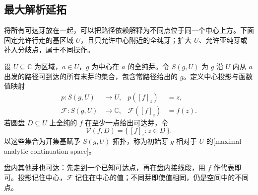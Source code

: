 \subsection{最大解析延拓}
\label{b3:subsec:090204}

将所有可达芽放在一起，可以把路径依赖解释为不同点位于同一个中心上方。下面固定允许行走的基区域 \(U\)，且只允许中心附近的全纯芽；扩大 \(U\)、允许亚纯芽或补入分歧点，属于不同操作。

\begin{definition}\label{b3:def:09-maximal-germ-space}
设 \(U\subseteq\mathbb C\) 为区域，\(a\in U\)，\(g\) 为中心在 \(a\) 的全纯芽。令 \(S(g,U)\) 为 \(g\) 沿 \(U\) 内从 \(a\) 出发的路径可到达的所有末芽的集合，包含常路径给出的 \(g\)。定义中心投影与函数值映射
\[
 \begin{aligned}
 p:S(g,U)&\longrightarrow U,&p([f]_z)&=z,\\
 \mathcal F:S(g,U)&\longrightarrow\mathbb C,&\mathcal F([f]_z)&=f(z).
 \end{aligned}
\]
若圆盘 \(D\subseteq U\) 上全纯的 \(f\) 在至少一点给出可达芽，令
\[
 \mathcal V(f,D)=\{\,[f]_z:z\in D\,\}.
\]
以这些集合为开集基赋予 \(S(g,U)\) 拓扑，称为初始芽 \(g\) 相对于 \(U\) 的[maximal analytic continuation space]。
\end{definition}
盘内其他芽也可达：先走到一个已知可达点，再在盘内接线段，用 \(f\) 作代表即可。投影记住中心，\(\mathcal F\) 记住在中心的值；不同芽即使值相同，仍是空间中的不同点。

